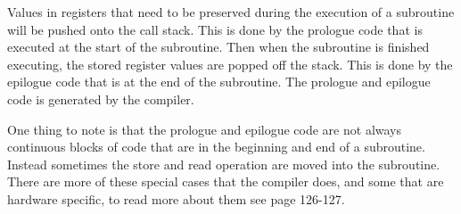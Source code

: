  


Values in registers that need to be preserved during the execution of a subroutine will be pushed onto the call stack.
This is done by the prologue code that is executed at the start of the subroutine.
Then when the subroutine is finished executing, the stored register values are popped off the stack.
This is done by the epilogue code that is at the end of the subroutine.
The prologue and epilogue code is generated by the compiler.


One thing to note is that the prologue and epilogue code are not always continuous blocks of code that are in the beginning and end of a subroutine.
Instead sometimes the store and read operation are moved into the subroutine.
There are more of these special cases that the compiler does, and some that are hardware specific, to read more about them see \cite{dwarf} page 126-127.

